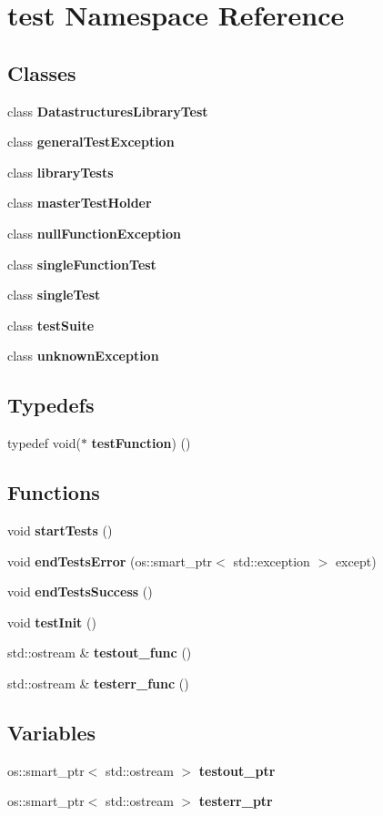 \section{test Namespace Reference}
\label{namespacetest}
\subsection*{Classes}
\begin{DoxyCompactItemize}
\item 
class {\bf Datastructures\+Library\+Test}
\item 
class {\bf general\+Test\+Exception}
\item 
class {\bf library\+Tests}
\item 
class {\bf master\+Test\+Holder}
\item 
class {\bf null\+Function\+Exception}
\item 
class {\bf single\+Function\+Test}
\item 
class {\bf single\+Test}
\item 
class {\bf test\+Suite}
\item 
class {\bf unknown\+Exception}
\end{DoxyCompactItemize}
\subsection*{Typedefs}
\begin{DoxyCompactItemize}
\item 
typedef void($\ast$ {\bf test\+Function}) ()
\end{DoxyCompactItemize}
\subsection*{Functions}
\begin{DoxyCompactItemize}
\item 
void {\bf start\+Tests} ()
\item 
void {\bf end\+Tests\+Error} (os\+::smart\+\_\+ptr$<$ std\+::exception $>$ except)
\item 
void {\bf end\+Tests\+Success} ()
\item 
void {\bf test\+Init} ()
\item 
std\+::ostream \& {\bf testout\+\_\+func} ()
\item 
std\+::ostream \& {\bf testerr\+\_\+func} ()
\end{DoxyCompactItemize}
\subsection*{Variables}
\begin{DoxyCompactItemize}
\item 
os\+::smart\+\_\+ptr$<$ std\+::ostream $>$ {\bf testout\+\_\+ptr}
\item 
os\+::smart\+\_\+ptr$<$ std\+::ostream $>$ {\bf testerr\+\_\+ptr}
\end{DoxyCompactItemize}


